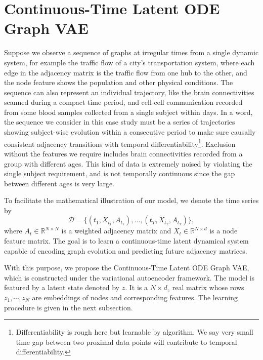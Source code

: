 \section{Continuous-Time Latent ODE Graph VAE}

Suppose we observe a sequence of graphs at irregular times from a single dynamic system, 
for example the traffic flow of a city's transportation system, 
where each edge in the adjacency matrix is the traffic flow from one hub to the other, 
and the node feature shows the population and other physical conditions. 
The sequence can also represent an individual trajectory,
like the brain connectivities scanned during a compact time period, 
and cell-cell communication recorded from some blood samples collected from a single subject within days. 
In a word, the sequence we consider in this case study must be a series of trajectories showing 
subject-wise evolution within a consecutive period to make sure causally consistent adjacency transitions 
with temporal differentiability\footnote{Differentiability is rough here but learnable by algorithm. We say very small time gap between two proximal data points will contribute to temporal differentiability.}. 
Exclusion without the features we require includes brain connectivities recorded from a group with different ages. 
This kind of data is extremely noised by violating the single subject requirement, 
and is not temporally continuous since the gap between different ages is very large.

To facilitate the mathematical illustration of our model, we denote the time series by
\begin{equation*}
    \mathcal{D}=\{(t_1,X_{t_1},A_{t_1}),\ldots,(t_T,X_{t_T},A_{t_T})\},
\end{equation*}
where $A_t\in\mathbb{R}^{N\times N}$ is a weighted adjacency matrix and
$X_t\in\mathbb{R}^{N\times d}$ is a node feature matrix.
The goal is to learn a continuous-time latent dynamical system capable of
encoding graph evolution and predicting future adjacency matrices.

With this purpose, we propose the Continuous-Time Latent ODE Graph VAE, 
which is constructed under the variational autoencoder framework. 
The model is featured by a latent state denoted by $z$. 
It is a $N\times d_z$ real matrix whose rows $z_1,\cdots,z_N$ are embeddings of nodes and corresponding features. 
The learning procedure is given in the next subsection. 


